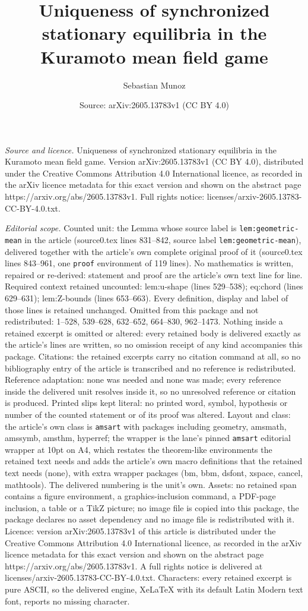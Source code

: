 \documentclass[10pt,a4paper]{amsart}
\title[Uniqueness of synchronized stationary equilibria in the Kura]{Uniqueness of synchronized stationary equilibria in the Kuramoto mean field game}
\author{Sebastian Munoz}
\date{Source: arXiv:2605.13783v1 (CC BY 4.0)}
\begin{document}
\maketitle

\noindent\emph{Source and licence.} Uniqueness of synchronized stationary equilibria in the Kuramoto mean field game. Version arXiv:2605.13783v1 (CC BY 4.0), distributed under the Creative Commons Attribution 4.0 International licence, as recorded in the arXiv licence metadata for this exact version and shown on the abstract page https://arxiv.org/abs/2605.13783v1. Full rights notice: licenses/arxiv-2605.13783-CC-BY-4.0.txt.\par\smallskip

\noindent\textit{Editorial scope.} Counted unit: the Lemma whose source label is \texttt{lem:geometric-mean} in the article (source0.tex lines 831--842, source label \texttt{lem:geometric-mean}), delivered together with the article's own complete original proof of it (source0.tex lines 843--961, one \texttt{proof} environment of 119 lines). No mathematics is written, repaired or re-derived: statement and proof are the article's own text line for line. Required context retained uncounted: lem:u-shape (lines 529--538); eq:chord (lines 629--631); lem:Z-bounds (lines 653--663). Every definition, display and label of those lines is retained unchanged. Omitted from this package and not redistributed: 1--528, 539--628, 632--652, 664--830, 962--1473. Nothing inside a retained excerpt is omitted or altered: every retained body is delivered exactly as the article's lines are written, so no omission receipt of any kind accompanies this package. Citations: the retained excerpts carry no citation command at all, so no bibliography entry of the article is transcribed and no reference is redistributed. Reference adaptation: none was needed and none was made; every reference inside the delivered unit resolves inside it, so no unresolved reference or citation is produced. Printed slips kept literal: no printed word, symbol, hypothesis or number of the counted statement or of its proof was altered. Layout and class: the article's own class is \texttt{amsart} with packages including geometry, amsmath, amssymb, amsthm, hyperref; the wrapper is the lane's pinned \texttt{amsart} editorial wrapper at 10pt on A4, which restates the theorem-like environments the retained text needs and adds the article's own macro definitions that the retained text needs (none), with extra wrapper packages (bm, bbm, dsfont, xspace, cancel, mathtools). The delivered numbering is the unit's own. Assets: no retained span contains a figure environment, a graphics-inclusion command, a PDF-page inclusion, a table or a TikZ picture; no image file is copied into this package, the package declares no asset dependency and no image file is redistributed with it. Licence: version arXiv:2605.13783v1 of this article is distributed under the Creative Commons Attribution 4.0 International licence, as recorded in the arXiv licence metadata for this exact version and shown on the abstract page https://arxiv.org/abs/2605.13783v1. A full rights notice is delivered at licenses/arxiv-2605.13783-CC-BY-4.0.txt. Characters: every retained excerpt is pure ASCII, so the delivered engine, XeLaTeX with its default Latin Modern text font, reports no missing character.
\end{document}

